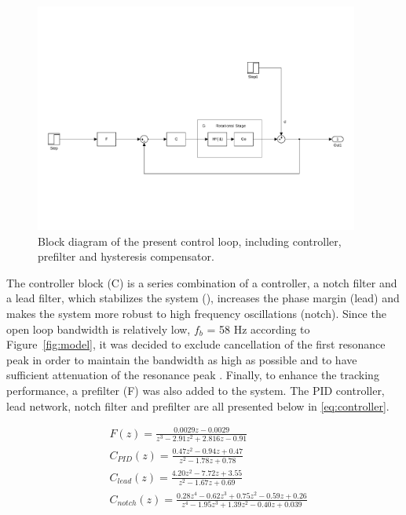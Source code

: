 \begin{figure}[h!]
  \centering %
  \includegraphics[width=0.95\textwidth, trim=4cm 4cm 2.1cm 10cm, clip=true]{fig/matlab/present_controller}
  \caption{\label{fig:present}Block diagram of the present control loop, including controller, prefilter and hysteresis compensator.}
\end{figure}

The controller block (C) is a series combination of a \abbrPID controller, a notch filter and a lead filter, which stabilizes the system (\abbrPID), increases the phase margin (lead) and makes the system more robust to high frequency oscillations (notch). Since the open loop bandwidth is relatively low, $f_b$ = 58 Hz according to Figure~\ref{fig:model}, it was decided to exclude cancellation of the first resonance peak in order to maintain the bandwidth as high as possible and to have sufficient attenuation of the resonance peak \citep{ButcherController:2015}. Finally, to enhance the tracking performance, a prefilter (F) was also added to the system. The PID controller, lead network, notch filter and prefilter are all presented below in \eqref{eq:controller}.

\begin{subequations}
  \label{eq:controller}
\begin{alignat}{2}
  \label{eq:pre}
  & F(z) = \frac{0.0029z - 0.0029}{z^3 - 2.91z^2 + 2.816 z - 0.91} \\
  \label{eq:pid}
  & C_{PID}(z) = \frac{0.47z^2 - 0.94z + 0.47}{z^2 - 1.78 z + 0.78} \\
  \label{eq:lead}
  & C_{lead}(z) = \frac{4.20 z^2 - 7.72z + 3.55}{z^2 - 1.67z + 0.69} \\
  \label{eq:notch}
  & C_{notch}(z) = \frac{0.28z^4 - 0.62z^3 + 0.75z^2 - 0.59z + 0.26}{z^4 - 1.95z^3 + 1.39z^2 - 0.40z + 0.039}
\end{alignat}
\end{subequations}

